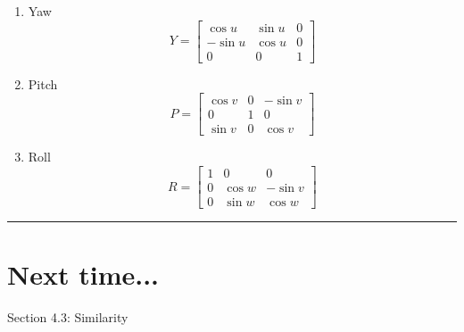 \begin{enumerate}
	\item Yaw
	\[  Y = \begin{bmatrix} \cos u  &  \sin u  &   0 \\  -\sin u  &  \cos u  &   0 \\  0  &  0  &   1  \end{bmatrix}  \]
	
	
	\item Pitch
	\[  P= \begin{bmatrix} \cos v &  0 &   -\sin v  \\  0  &  1  &   0 \\  \sin v   &  0  &   \cos v  \end{bmatrix}  \]
	
	
	
	
	\item Roll
	\[    R = \begin{bmatrix} 1 &  0 &   0 \\  0  &  \cos w &   -\sin v \\   0    &  \sin w  &   \cos w  \end{bmatrix}  \]
	
\end{enumerate}






\rule[0.01in]{\textwidth}{0.0025in}









\section*{Next time...}
Section 4.3: Similarity

